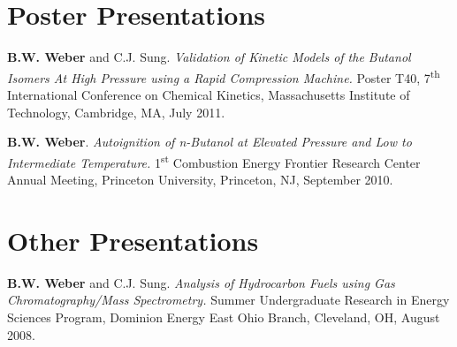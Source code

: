 \documentclass[margin,line]{res}
\newenvironment{list3}{
  \begin{list}{\ding{113}}{%
      \setlength{\itemsep}{0.1in}
      \setlength{\parsep}{0in} \setlength{\parskip}{0in}
      \setlength{\topsep}{0in} \setlength{\partopsep}{0in} 
      \setlength{\leftmargin}{0in}}}{\end{list}}
\begin{document}
\begin{resume}
\vspace{1em}

\section{\sc Poster Presentations}
\begin{list3}
\item[] {\bf B.W. Weber} and C.J. Sung. {\em Validation of Kinetic Models of the Butanol Isomers At High Pressure using a Rapid Compression Machine.} Poster T40, 7\textsuperscript{th} International Conference on Chemical Kinetics, Massachusetts Institute of Technology, Cambridge, MA, July 2011.
\item[] {\bf B.W. Weber}. {\em Autoignition of n-Butanol at Elevated Pressure and Low to Intermediate Temperature.} 1\textsuperscript{st} Combustion Energy Frontier Research Center Annual Meeting, Princeton University, Princeton, NJ, September 2010.
\end{list3}

\section{\sc Other Presentations}
\begin{list3}
\item[] {\bf B.W. Weber} and C.J. Sung. {\em Analysis of Hydrocarbon Fuels using Gas Chromatography/Mass Spectrometry.} Summer Undergraduate Research in Energy Sciences Program, Dominion Energy East Ohio Branch, Cleveland, OH, August 2008.
\end{list3}


\end{resume}
\end{document}
